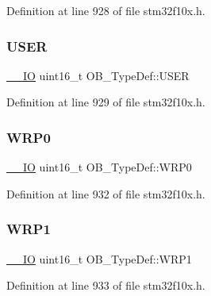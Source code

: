 Definition at line 928 of file stm32f10x.\+h.

\mbox{\label{struct_o_b___type_def_ab0292062a80446c97dac24604bd8ed8e}} 
\subsubsection{\texorpdfstring{U\+S\+ER}{USER}}
{\footnotesize\ttfamily \hyperlink{core__sc300_8h_aec43007d9998a0a0e01faede4133d6be}{\+\_\+\+\_\+\+IO} uint16\+\_\+t O\+B\+\_\+\+Type\+Def\+::\+U\+S\+ER}



Definition at line 929 of file stm32f10x.\+h.

\mbox{\label{struct_o_b___type_def_acee93898f092604a871e52d64560e7a9}} 
\subsubsection{\texorpdfstring{W\+R\+P0}{WRP0}}
{\footnotesize\ttfamily \hyperlink{core__sc300_8h_aec43007d9998a0a0e01faede4133d6be}{\+\_\+\+\_\+\+IO} uint16\+\_\+t O\+B\+\_\+\+Type\+Def\+::\+W\+R\+P0}



Definition at line 932 of file stm32f10x.\+h.

\mbox{\label{struct_o_b___type_def_ad397993d8c149a64e3f2a8bc7ecdf1c5}} 
\subsubsection{\texorpdfstring{W\+R\+P1}{WRP1}}
{\footnotesize\ttfamily \hyperlink{core__sc300_8h_aec43007d9998a0a0e01faede4133d6be}{\+\_\+\+\_\+\+IO} uint16\+\_\+t O\+B\+\_\+\+Type\+Def\+::\+W\+R\+P1}



Definition at line 933 of file stm32f10x.\+h.

\mbox{\label{struct_o_b___type_def_a475b2347222db8e35d7ade1a881ca31c}} 
